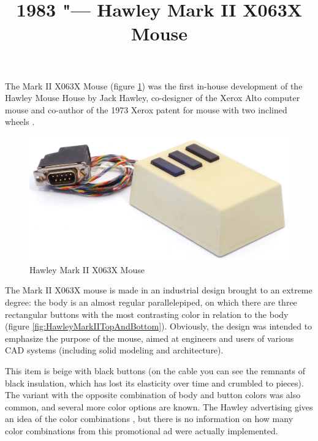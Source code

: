 \documentclass[11pt, a4paper]{article}
\begin{document}
\title{1983 "--- Hawley Mark II X063X Mouse}
\date{}
\maketitle
{}
The Mark II X063X Mouse (figure \ref{fig:HawleyMarkIIPic}) was the first in-house development of the Hawley Mouse House \cite{hawley,mouses} by Jack Hawley, co-designer of the Xerox Alto computer mouse and co-author of the 1973 Xerox patent for mouse with two inclined wheels \cite{pat}.

\begin{figure}[h]
   \centering
    \includegraphics[scale=0.6]{1983_hawley_mark_ii/pic_60.jpg}
    \caption{Hawley Mark II X063X Mouse}
    \label{fig:HawleyMarkIIPic}
\end{figure}

The Mark II X063X mouse is made in an industrial design brought to an extreme degree: the body is an almost regular parallelepiped, on which there are three rectangular buttons with the most contrasting color in relation to the body (figure \ref{fig:HawleyMarkIITopAndBottom}). Obviously, the design was intended to emphasize the purpose of the mouse, aimed at engineers and users of various CAD systems (including solid modeling and architecture).

This item is beige with black buttons (on the cable you can see the remnants of black insulation, which has lost its elasticity over time and crumbled to pieces). The variant with the opposite combination of body and button colors was also common, and several more color options are known. The Hawley advertising gives an idea of the color combinations \cite{brochure}, but there is no information on how many color combinations from this promotional ad were actually implemented.
\end{document}

